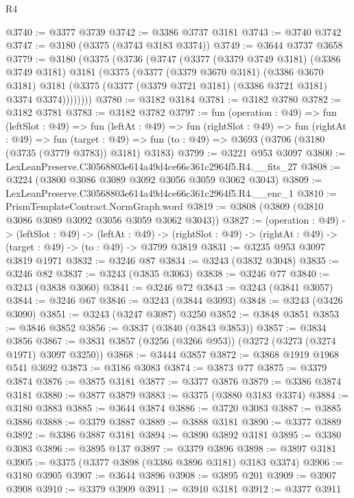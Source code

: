 \begin{lexlean}{R4}
\begin{coremodule}
@3740 := @3377 @3739
@3742 := @3386 @3737 @3181
@3743 := @3740 @3742
@3747 := @3180 (@3375 (@3743 @3183 @3374))
@3749 := @3644 @3737 @3658
@3779 := @3180
    (@3375
      (@3736
        (@3747
          (@3377
            (@3379 @3749 @3181)
            (@3386 @3749 @3181)
            @3181
            (@3375
              (@3377
                (@3379 @3670 @3181)
                (@3386 @3670 @3181)
                @3181
                (@3375 (@3377 (@3379 @3721 @3181) (@3386 @3721 @3181) @3374 @3374))))))))
@3780 := @3182 @3184
@3781 := @3182 @3780
@3782 := @3182 @3781
@3783 := @3182 @3782
@3797 := fun (operation : @49) =>
  fun (leftSlot : @49) =>
  fun (leftAt : @49) =>
  fun (rightSlot : @49) =>
  fun (rightAt : @49) =>
  fun (target : @49) => fun (to : @49) => @3693 (@3706 (@3180 (@3735 (@3779 @3783)) @3181) @3183)
@3799 := @3221 @953 @3097
@3800 := LexLeanPreserve.C30568803e614a49d4ce66c361c2964f5.R4.__fits_27
@3808 := @3224 (@3800 @3086 @3089 @3092 @3056 @3059 @3062 @3043)
@3809 := LexLeanPreserve.C30568803e614a49d4ce66c361c2964f5.R4.__enc_1
@3810 := PrismTemplateContract.NormGraph.word
@3819 := @3808 (@3809 (@3810 @3086 @3089 @3092 @3056 @3059 @3062 @3043))
@3827 := (operation : @49) ->
  (leftSlot : @49) ->
  (leftAt : @49) ->
  (rightSlot : @49) -> (rightAt : @49) -> (target : @49) -> (to : @49) -> @3799 @3819
@3831 := @3235 @953 @3097 @3819 @1971
@3832 := @3246 @87
@3834 := @3243 (@3832 @3048)
@3835 := @3246 @82
@3837 := @3243 (@3835 @3063)
@3838 := @3246 @77
@3840 := @3243 (@3838 @3060)
@3841 := @3246 @72
@3843 := @3243 (@3841 @3057)
@3844 := @3246 @67
@3846 := @3243 (@3844 @3093)
@3848 := @3243 (@3426 @3090)
@3851 := @3243 (@3247 @3087) @3250
@3852 := @3848 @3851
@3853 := @3846 @3852
@3856 := @3837 (@3840 (@3843 @3853))
@3857 := @3834 @3856
@3867 := @3831 @3857 (@3256 (@3266 @953)) (@3272 (@3273 (@3274 @1971) @3097 @3250))
@3868 := @3444 @3857
@3872 := @3868 @1919 @1968 @541 @3692
@3873 := @3186 @3083
@3874 := @3873 @77
@3875 := @3379 @3874
@3876 := @3875 @3181
@3877 := @3377 @3876
@3879 := @3386 @3874 @3181
@3880 := @3877 @3879
@3883 := @3375 (@3880 @3183 @3374)
@3884 := @3180 @3883
@3885 := @3644 @3874
@3886 := @3720 @3083
@3887 := @3885 @3886
@3888 := @3379 @3887
@3889 := @3888 @3181
@3890 := @3377 @3889
@3892 := @3386 @3887 @3181
@3894 := @3890 @3892 @3181
@3895 := @3380 @3083
@3896 := @3895 @137
@3897 := @3379 @3896
@3898 := @3897 @3181
@3905 := @3375 (@3377 @3898 (@3386 @3896 @3181) @3183 @3374)
@3906 := @3180 @3905
@3907 := @3644 @3896
@3908 := @3895 @201
@3909 := @3907 @3908
@3910 := @3379 @3909
@3911 := @3910 @3181
@3912 := @3377 @3911

\end{coremodule}
\end{lexlean}
